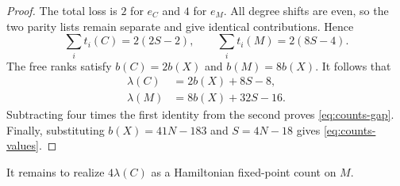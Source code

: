 \begin{proof}
The total loss is $2$ for $e_C$ and $4$ for $e_M$.  All degree shifts
are even, so the two parity lists remain separate and give identical
contributions.  Hence
\begin{equation}\label{eq:counts-total-torsion}
 \sum_i t_i(C)=2(2S-2),\qquad
 \sum_i t_i(M)=2(8S-4).
\end{equation}
The free ranks satisfy $b(C)=2b(X)$ and $b(M)=8b(X)$.  It follows
that
\begin{align*}
 \lambda(C)&=2b(X)+8S-8,\\
 \lambda(M)&=8b(X)+32S-16.
\end{align*}
Subtracting four times the first identity from the second proves
\eqref{eq:counts-gap}.  Finally, substituting $b(X)=41N-183$ and
$S=4N-18$ gives \eqref{eq:counts-values}.
\end{proof}

It remains to realize $4\lambda(C)$ as a Hamiltonian fixed-point count on $M$.
